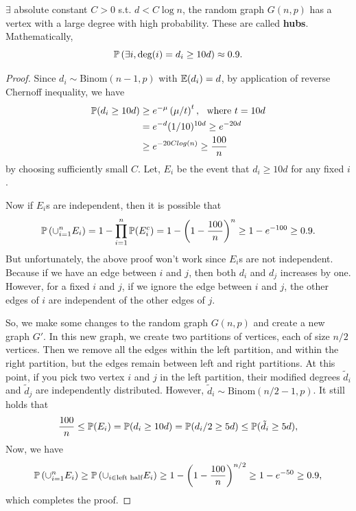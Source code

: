 \documentclass[12pt]{article}
\begin{document}
\begin{theorembox}
    $\exists$ absolute constant $C > 0$ s.t. $d < C \log n$, the random graph $G(n, p)$ has a vertex with a large degree with high probability. These are called \textbf{hubs}. Mathematically,
    \begin{equation*}
        \mathbb{P}\left( \exists i, \text{deg}(i) = d_i \geq 10d  \right) \approx 0.9.
    \end{equation*}
\end{theorembox}

\begin{proof}
    Since $d_i \sim \text{Binom}(n-1, p)$ with $\mathbb{E}(d_i) = d$, by application of reverse Chernoff inequality, we have
    \begin{align*}
        \mathbb{P}(d_i \geq 10d)
         & \geq e^{-\mu} \left( \mu / t \right)^t, \ \text{ where } t = 10d \\
         & = e^{-d} (1/10)^{10d} \geq e^{-20d}                              \\
         & \geq e^{-20Clog(n)} \geq \dfrac{100}{n}
    \end{align*}
    \noindent by choosing sufficiently small $C$. Let, $E_i$ be the event that $d_i \geq 10d$ for any fixed $i$.

    Now if $E_i$s are independent, then it is possible that
    \begin{equation*}
        \mathbb{P}\left( \cup_{i=1}^n E_i \right) = 1 - \prod_{i=1}^n \mathbb{P}(E_i^c) = 1 - \left( 1 - \dfrac{100}{n} \right)^n \geq 1 - e^{-100} \geq 0.9.
    \end{equation*}
    \noindent But unfortunately, the above proof won't work since $E_i$s are not independent. Because if we have an edge between $i$ and $j$, then both $d_i$ and $d_j$ increases by one. However, for a fixed $i$ and $j$, if we ignore the edge between $i$ and $j$, the other edges of $i$ are independent of the other edges of $j$.

    So, we make some changes to the random graph $G(n, p)$ and create a new graph $G'$. In this new graph, we create two partitions of vertices, each of size $n/2$ vertices. Then we remove all the edges within the left partition, and within the right partition, but the edges remain between left and right partitions. At this point, if you pick two vertex $i$ and $j$ in the left partition, their modified degrees $\tilde{d}_i$ and $\tilde{d}_j$ are independently distributed. However, $\tilde{d}_i \sim \text{Binom}(n/2-1,p)$. It still holds that
    \begin{equation*}
        \dfrac{100}{n} \leq \mathbb{P}(E_i) = \mathbb{P}(d_i \geq 10d) = \mathbb{P}(d_i / 2 \geq 5d) \leq \mathbb{P}(\tilde{d}_i \geq 5d),
    \end{equation*}
    \noindent Now, we have
    \begin{equation*}
        \mathbb{P}\left( \cup_{i=1}^n E_i \right) \geq \mathbb{P}\left( \cup_{i \in \text{left half}} E_i \right) \geq 1 - \left( 1 - \dfrac{100}{n} \right)^{n/2} \geq 1 - e^{-50} \geq 0.9,
    \end{equation*}
    \noindent which completes the proof.
\end{proof}
\end{document}

